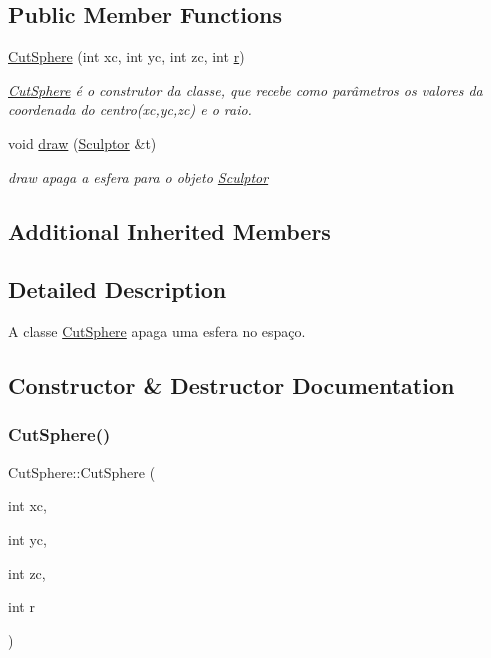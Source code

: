 \subsection*{Public Member Functions}
\begin{DoxyCompactItemize}
\item 
\hyperlink{class_cut_sphere_a7361cbe0f036f9d496e4c83c5b2fea70}{Cut\+Sphere} (int xc, int yc, int zc, int \hyperlink{class_figura_geometrica_a0a4f57efb1a6c525c8aeee34c92e7eab}{r})
\begin{DoxyCompactList}\small\item\em \hyperlink{class_cut_sphere}{Cut\+Sphere} é o construtor da classe, que recebe como parâmetros os valores da coordenada do centro(xc,yc,zc) e o raio. \end{DoxyCompactList}\item 
void \hyperlink{class_cut_sphere_ad62239c047f0817ba6fd4b85ae2eae42}{draw} (\hyperlink{class_sculptor}{Sculptor} \&t)
\begin{DoxyCompactList}\small\item\em draw apaga a esfera para o objeto \hyperlink{class_sculptor}{Sculptor} \end{DoxyCompactList}\end{DoxyCompactItemize}
\subsection*{Additional Inherited Members}


\subsection{Detailed Description}
A classe \hyperlink{class_cut_sphere}{Cut\+Sphere} apaga uma esfera no espaço. 

\subsection{Constructor \& Destructor Documentation}
\mbox{\label{class_cut_sphere_a7361cbe0f036f9d496e4c83c5b2fea70}} 
\subsubsection{\texorpdfstring{Cut\+Sphere()}{CutSphere()}}
{\footnotesize\ttfamily Cut\+Sphere\+::\+Cut\+Sphere (\begin{DoxyParamCaption}\item[{int}]{xc,  }\item[{int}]{yc,  }\item[{int}]{zc,  }\item[{int}]{r }\end{DoxyParamCaption})}



